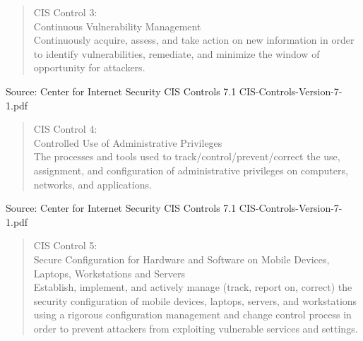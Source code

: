 \documentclass[Screen16to9,17pt]{foils}
\begin{document}
\begin{quote}
CIS Control 3:\\
Continuous Vulnerability Management\\
Continuously acquire, assess, and take action on new information in order to identify vulnerabilities, remediate, and minimize the window of opportunity for attackers.
\end{quote}

\begin{list1}
\item
\item
\item
\item
\end{list1}

Source: Center for Internet Security CIS Controls 7.1 CIS-Controls-Version-7-1.pdf


\begin{quote}
CIS Control 4:\\
Controlled Use of Administrative Privileges\\
The processes and tools used to track/control/prevent/correct the use, assignment, and configuration of administrative privileges on computers, networks, and applications.
\end{quote}

\begin{list1}
\item
\item
\item
\item
\end{list1}

Source: Center for Internet Security CIS Controls 7.1 CIS-Controls-Version-7-1.pdf


\begin{quote}
CIS Control 5:\\
Secure Configuration for Hardware and Software on Mobile Devices, Laptops, Workstations and Servers\\
Establish, implement, and actively manage (track, report on, correct) the security configuration of mobile devices, laptops, servers, and workstations using a rigorous configuration management and change control process in order to prevent attackers from exploiting vulnerable services and settings.
\end{quote}
\end{document}
